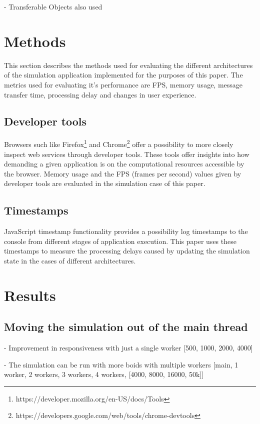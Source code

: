 \documentclass[conference]{IEEEtran}
\begin{document}
- Transferable Objects also used

\section{Methods}
\label{sec:methods}

This section describes the methods used for evaluating the different architectures of the simulation application implemented for the purposes of this paper. The metrics used for evaluating it's performance are FPS, memory usage, message transfer time, processing delay and changes in user experience.

\subsection{Developer tools}

Browsers such like Firefox\footnote{https://developer.mozilla.org/en-US/docs/Tools} and Chrome\footnote{https://developers.google.com/web/tools/chrome-devtools} offer a 
possibility to more closely inspect web services through developer tools. These tools offer insights into how demanding a given application
is on the computational resources accessible by the browser. Memory usage and the FPS (frames per second) values given by developer tools are evaluated in the simulation
case of this paper.

\subsection{Timestamps}

JavaScript timestamp functionality provides a possibility log timestamps to the console from different stages of application execution. This paper uses these timestamps to
measure the processing delays caused by updating the simulation state in the cases of different architectures.

\section{Results}
\label{sec:sec2}

\subsection{Moving the simulation out of the main thread}
- Improvement in responsiveness with just a single worker [500, 1000, 2000, 4000]

- The simulation can be run with more boids with multiple workers [main, 1 worker, 2 workers, 3 workers, 4 workers, [4000, 8000, 16000, 50k]]
\end{document}
